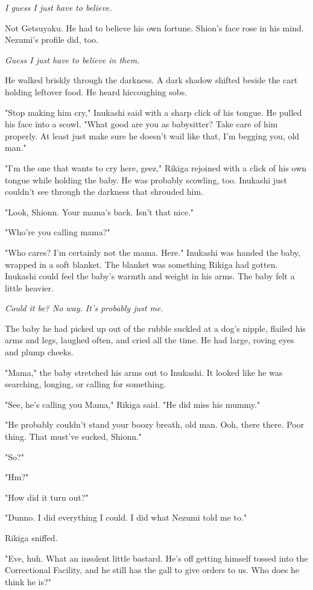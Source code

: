 \emph{I guess I just have to believe.}

Not Getsuyaku. He had to believe his own fortune. Shion's face rose in
his mind. Nezumi's profile did, too.

\emph{Guess I just have to believe in them.}

He walked briskly through the darkness. A dark shadow shifted beside the
cart holding leftover food. He heard hiccoughing sobs.

"Stop making him cry," Inukashi said with a sharp click of his tongue.
He pulled his face into a scowl. "What good are you as babysitter? Take
care of him properly. At least just make sure he doesn't wail like that,
I'm begging you, old man."

"I'm the one that wants to cry here, geez," Rikiga rejoined with a click
of his own tongue while holding the baby. He was probably scowling, too.
Inukashi just couldn't see through the darkness that shrouded him.

"Look, Shionn. Your mama's back. Isn't that nice."

"Who're you calling mama?"

"Who cares? I'm certainly not the mama. Here." Inukashi was handed the
baby, wrapped in a soft blanket. The blanket was something Rikiga had
gotten. Inukashi could feel the baby's warmth and weight in his arms.
The baby felt a little heavier.

\emph{Could it be? No way. It's probably just me.}

The baby he had picked up out of the rubble suckled at a dog's nipple,
flailed his arms and legs, laughed often, and cried all the time. He had
large, roving eyes and plump cheeks.

"Mama," the baby stretched his arms out to Inukashi. It looked like he
was searching, longing, or calling for something.

"See, he's calling you Mama," Rikiga said. "He did miss his mummy."

"He probably couldn't stand your boozy breath, old man. Ooh, there
there. Poor thing. That must've sucked, Shionn."

"So?"

"Hm?"

"How did it turn out?"

"Dunno. I did everything I could. I did what Nezumi told me to."

Rikiga sniffed.

"Eve, huh. What an insolent little bastard. He's off getting himself
tossed into the Correctional Facility, and he still has the gall to give
orders to us. Who does he think he is?"


